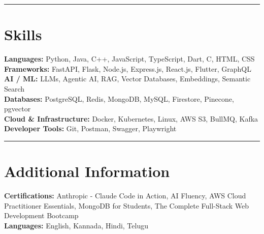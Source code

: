 \documentclass[a4paper,11pt]{article}
\newcommand{\sectionline}{
    \vspace{-9pt}
    \noindent\rule{\linewidth}{0.5pt}
    \vspace{-15pt}
}
\begin{document}
\sectionline


\section*{Skills}

\textbf{Languages:}
Python, Java, C++, JavaScript, TypeScript, Dart, C, HTML, CSS \\
\textbf{Frameworks:}
FastAPI, Flask, Node.js, Express.js, React.js, Flutter, GraphQL \\
\textbf{AI / ML:}
LLMs, Agentic AI, RAG, Vector Databases, Embeddings, Semantic Search \\
\textbf{Databases:}
PostgreSQL, Redis, MongoDB, MySQL, Firestore, Pinecone, pgvector \\
\textbf{Cloud \& Infrastructure:}
Docker, Kubernetes, Linux, AWS S3, BullMQ, Kafka \\
\textbf{Developer Tools:}
Git, Postman, Swagger, Playwright

\sectionline


\section*{Additional Information}

\textbf{Certifications:}
Anthropic - Claude Code in Action, AI Fluency, AWS Cloud Practitioner Essentials, MongoDB for Students, The Complete Full-Stack Web Development Bootcamp
\\
\textbf{Languages:}
English, Kannada, Hindi, Telugu
\end{document}
